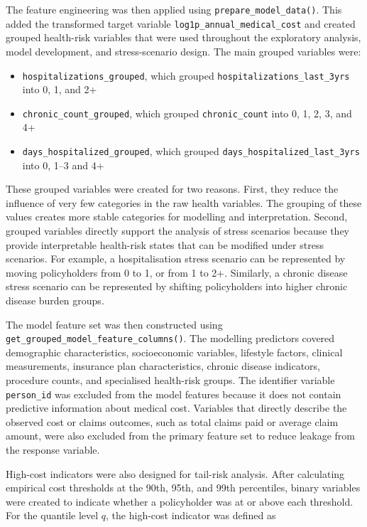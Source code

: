 	The feature engineering was then applied using \verb|prepare_model_data()|. This added the transformed target variable \verb|log1p_annual_medical_cost| and created grouped health-risk variables that were used throughout the exploratory analysis, model development, and stress-scenario design. The main grouped variables were:
	
	\begin{itemize}
		\item \verb|hospitalizations_grouped|, which grouped \verb|hospitalizations_last_3yrs| into 0, 1, and 2+
		\item \verb|chronic_count_grouped|, which grouped \verb|chronic_count| into 0, 1, 2, 3, and 4+
		\item \verb|days_hospitalized_grouped|, which grouped \verb|days_hospitalized_last_3yrs| into 0, 1--3 and 4+
	\end{itemize}
	
	These grouped variables were created for two reasons. First, they reduce the influence of very few categories in the raw health variables. The grouping of these values creates more stable categories for modelling and interpretation. Second, grouped variables directly support the analysis of stress scenarios because they provide interpretable health-risk states that can be modified under stress scenarios. For example, a hospitalisation stress scenario can be represented by moving policyholders from 0 to 1, or from 1 to 2+. Similarly, a chronic disease stress scenario can be represented by shifting policyholders into higher chronic disease burden groups.
	
	The model feature set was then constructed using \verb|get_grouped_model_feature_columns()|. The modelling predictors covered demographic characteristics, socioeconomic variables, lifestyle factors, clinical measurements, insurance plan characteristics, chronic disease indicators, procedure counts, and specialised health-risk groups. The identifier variable \verb|person_id| was excluded from the model features because it does not contain predictive information about medical cost. Variables that directly describe the observed cost or claims outcomes, such as total claims paid or average claim amount, were also excluded from the primary feature set to reduce leakage from the response variable.
	
	High-cost indicators were also designed for tail-risk analysis. After calculating empirical cost thresholds at the 90th, 95th, and 99th percentiles, binary variables were created to indicate whether a policyholder was at or above each threshold. For the quantile level \(q\), the high-cost indicator was defined as
	
